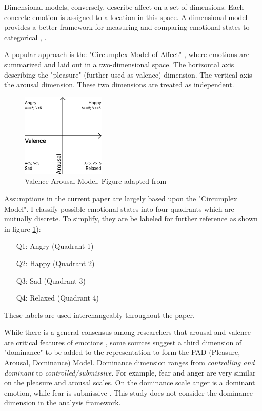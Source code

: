 		Dimensional models, conversely, describe affect on a set of dimensions. Each concrete emotion is assigned to a location in this space. A dimensional model provides a better framework for measuring and comparing emotional states to categorical \cite{SreejaPSMahalakshmi2017}, \cite{Harley2016}.
		
		A popular approach is the "Circumplex Model of Affect" \cite{Russell1980}, where emotions are summarized and laid out in a two-dimensional space. The horizontal axis describing the "pleasure" (further used as valence) dimension. The vertical axis - the arousal dimension. These two dimensions are treated as independent.
		
		\begin{figure}[t]
			\begin{center}
				\includegraphics[width=150px]{graphics/Valence-Arousal-Model-0.png}
				\caption{Valence Arousal Model. Figure adapted from \cite{Song2013} \label{fig:valence_arousal_model}}
				
			\end{center}
		\end{figure}
	
		Assumptions in the current paper are largely based upon the "Circumplex Model". I classify possible emotional states into four quadrants which are mutually discrete. To simplify, they are be labeled for further reference as shown in figure \ref{fig:valence_arousal_model}):
		\begin{enumerate}
			\item[Q1:] Angry 	(Quadrant 1)
			\item[Q2:] Happy 	(Quadrant 2)
			\item[Q3:] Sad 		(Quadrant 3)
			\item[Q4:] Relaxed 	(Quadrant 4)
		\end{enumerate}
		
		These labels are used interchangeably throughout the paper.
		
		While there is a general consensus among researchers that arousal and valence are critical features of emotions \cite{Harley2016}, some sources suggest a third dimension of "dominance" to be added to the representation to form the PAD (Pleasure, Arousal, Dominance) Model. Dominance dimension ranges from \textit{controlling and dominant} to \textit{controlled/submissive}. For example, fear and anger are very similar on the pleasure and arousal scales. On the dominance scale anger is a dominant emotion, while fear is submissive \cite{Mehrabian1974}.
		This study does not consider the dominance dimension in the analysis framework.
		
